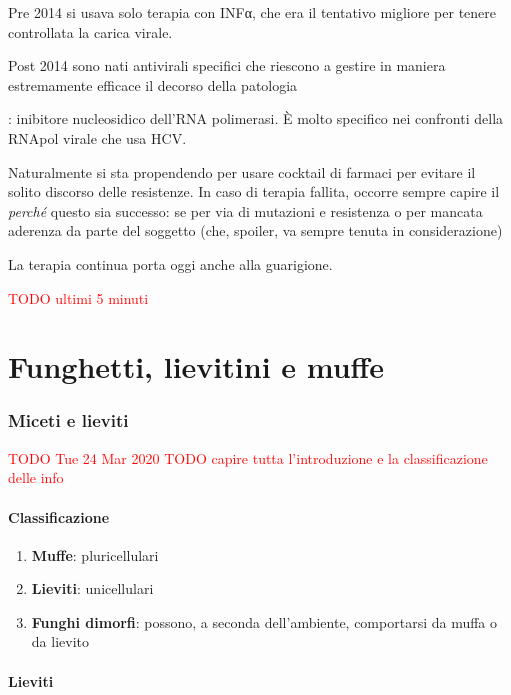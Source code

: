 \documentclass[italian,]{article}
\providecommand{\tightlist}{%
  \setlength{\itemsep}{0pt}\setlength{\parskip}{0pt}}
\newcommand{\far}[1]{ \fbox{\textsc{#1}} } %
\newcommand{\greenbox}[2]{\begin{tcolorbox}[title=#1,colback=green!5,colframe=green!35!black]#2\end{tcolorbox}} %
\newcommand{\TODO}[1]{\textcolor{red}{\textsf{\footnotesize{TODO #1}}}} %
\begin{document}
\greenbox{Epatite C e antivirali}{
Pre 2014 si usava solo terapia con INFα, che era il tentativo migliore
per tenere controllata la carica virale.

Post 2014 sono nati antivirali specifici che riescono a gestire in
maniera estremamente efficace il decorso della patologia

\tcblower

\far{Sofosbuvir}: inibitore nucleosidico dell'RNA polimerasi. È molto
specifico nei confronti della RNApol virale che usa HCV.

Naturalmente si sta propendendo per usare cocktail di farmaci per
evitare il solito discorso delle resistenze. In caso di terapia fallita,
occorre sempre capire il \emph{perché} questo sia successo: se per via
di mutazioni e resistenza o per mancata aderenza da parte del soggetto
(che, spoiler, va sempre tenuta in considerazione)

La terapia continua porta oggi anche alla guarigione.
}

\TODO{ultimi 5 minuti}

\clearpage
\part{Funghetti, lievitini e muffe}

\hypertarget{miceti-e-lieviti}{%
\section{Miceti e lieviti}\label{miceti-e-lieviti}}

\TODO{Tue 24 Mar 2020}
\TODO{capire tutta l'introduzione e la classificazione delle info}

\hypertarget{classificazione}{%
\subsection{Classificazione}\label{classificazione}}

\begin{enumerate}
\def\labelenumi{\arabic{enumi}.}
\tightlist
\item
  \textbf{Muffe}: pluricellulari
\item
  \textbf{Lieviti}: unicellulari
\item
  \textbf{Funghi dimorfi}: possono, a seconda dell'ambiente, comportarsi
  da muffa o da lievito
\end{enumerate}

\hypertarget{lieviti}{%
\subsection{Lieviti}\label{lieviti}}
\end{document}
